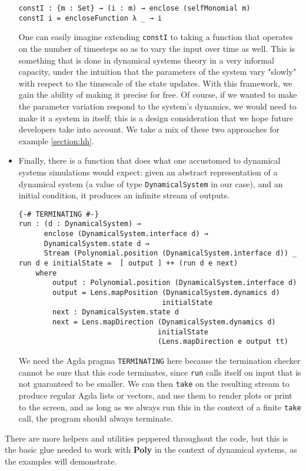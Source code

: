 \begin{itemize}
\begin{verbatim}
constI : {m : Set} → (i : m) → enclose (selfMonomial m)
constI i = encloseFunction λ _ → i
\end{verbatim}
    One can easily imagine extending \texttt{constI} to taking a function that operates on the number of timesteps so as to vary the input over time as well. This is something that is done in dynamical systems theory in a very informal capacity, under the intuition that the parameters of the system vary "slowly" with respect to the timescale of the state updates. With this framework, we gain the ability of making it precise for free. Of course, if we wanted to make the parameter variation respond to the system's dynamics, we would need to make it a system in itself; this is a design consideration that we hope future developers take into account. We take a mix of these two approaches for example \ref{section:hh}.
    \item Finally, there is a function that does what one accustomed to dynamical systems simulations would expect: given an abstract representation of a dynamical system (a value of type \texttt{DynamicalSystem} in our case), and an initial condition, it produces an infinite stream of outputs.
\begin{verbatim}
{-# TERMINATING #-}
run : (d : DynamicalSystem) → 
      enclose (DynamicalSystem.interface d) → 
      DynamicalSystem.state d → 
      Stream (Polynomial.position (DynamicalSystem.interface d)) _
run d e initialState =  [ output ] ++ (run d e next)
    where
        output : Polynomial.position (DynamicalSystem.interface d)
        output = Lens.mapPosition (DynamicalSystem.dynamics d) 
                                  initialState
        next : DynamicalSystem.state d
        next = Lens.mapDirection (DynamicalSystem.dynamics d) 
                                 initialState
                                 (Lens.mapDirection e output tt)
\end{verbatim}
    We need the Agda pragma \texttt{TERMINATING} here because the termination checker cannot be sure that this code terminates, since \texttt{run} calls itself on input that is not guaranteed to be smaller. We can then \texttt{take} on the resulting stream to produce regular Agda lists or vectors, and use them to render plots or print to the screen, and as long as we always run this in the context of a finite \texttt{take} call, the program should always terminate.
\end{itemize}
There are more helpers and utilities peppered throughout the code, but this is the basic glue needed to work with \textbf{Poly} in the context of dynamical systems, as the examples will demonstrate.


